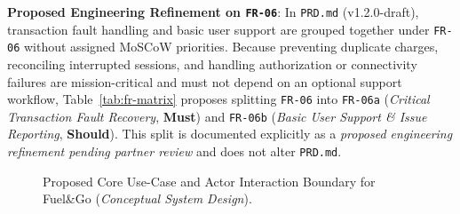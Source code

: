 \textbf{Proposed Engineering Refinement on \texttt{FR-06}}: In \texttt{PRD.md} (v1.2.0-draft), transaction fault handling and basic user support are grouped together under \texttt{FR-06} without assigned MoSCoW priorities. Because preventing duplicate charges, reconciling interrupted sessions, and handling authorization or connectivity failures are mission-critical and must not depend on an optional support workflow, Table~\ref{tab:fr-matrix} proposes splitting \texttt{FR-06} into \texttt{FR-06a} (\emph{Critical Transaction Fault Recovery}, \textbf{Must}) and \texttt{FR-06b} (\emph{Basic User Support \& Issue Reporting}, \textbf{Should}). This split is documented explicitly as a \emph{proposed engineering refinement pending partner review} and does not alter \texttt{PRD.md}.

\begin{figure}[!htbp]
  \centering
  
  \caption{Proposed Core Use-Case and Actor Interaction Boundary for Fuel\&Go (\emph{Conceptual System Design}).}
  \label{fig:use-case}
\end{figure}

